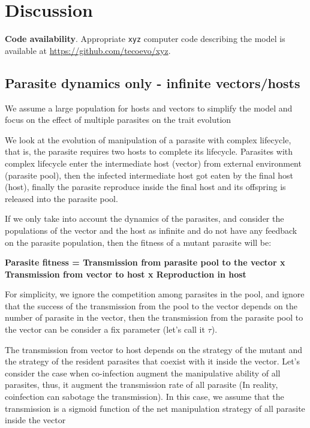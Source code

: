 \documentclass{article}
\begin{document}
\section{Discussion}



\textbf{Code availability}.
Appropriate {\tt{xyz}} computer code describing the model is available at {\url{https://github.com/tecoevo/xyz}}.







\appendix

\subsection{Parasite dynamics only - infinite vectors/hosts}

We assume a large population for hosts and vectors to simplify the model and focus on the effect of multiple parasites on the trait evolution

We look at the evolution of manipulation of a parasite with complex lifecycle, that is, the parasite requires two hosts to complete its lifecycle. Parasites with complex lifecycle enter the intermediate host (vector) from external environment (parasite pool), then the infected intermediate host got eaten by the final host (host), finally the parasite reproduce inside the final host and its offspring is released into the parasite pool.

If we only take into account the dynamics of the parasites, and consider the populations of the vector and the host as infinite and do not have any feedback on the parasite population, then the fitness of a mutant parasite will be:

\textbf{Parasite fitness = Transmission from parasite pool to the vector x Transmission from vector to host x Reproduction in host}

For simplicity, we ignore the competition among parasites in the pool, and ignore that the success of the transmission from the pool to the vector depends on the number of parasite in the vector, then the transmission from the parasite pool to the vector can be consider a fix parameter (let's call it $\tau$).

The transmission from vector to host depends on the strategy of the mutant and the strategy of the resident parasites that coexist with it inside the vector. Let's consider the case when co-infection augment the manipulative ability of all parasites, thus, it augment the transmission rate of all parasite (In reality, coinfection can sabotage the transmission). In this case, we assume that the transmission is a sigmoid function of the net manipulation strategy of all parasite inside the vector
\end{document}
